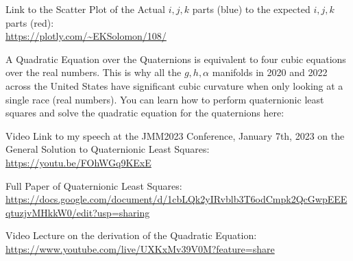 \documentclass[preprint,13pt]{elsarticle}
\begin{document}
Link to the Scatter Plot of the Actual $i,j,k$ parts (blue) to the expected $i,j,k$ parts (red):\\
\url{https://plotly.com/~EKSolomon/108/}

A Quadratic Equation over the Quaternions is equivalent to four cubic equations over the real numbers. This is why all the $g,h,\alpha$ manifolds in 2020 and 2022 across the United States have significant cubic curvature when only looking at a single race (real numbers). You can learn how to perform quaternionic least squares and solve the quadratic equation for the quaternions here:

Video Link to my speech at the JMM2023 Conference, January 7th, 2023 on the General Solution to Quaternionic Least Squares:\\
\url{https://youtu.be/FOhWGq9KExE}

Full Paper of Quaternionic Least Squares:\\
\url{https://docs.google.com/document/d/1cbLQk2yIRvblb3T6odCmpk2QcGwpEEEqtuzjvMHkkW0/edit?usp=sharing}

Video Lecture on the derivation of the Quadratic Equation:\\
\url{https://www.youtube.com/live/UXKxMv39V0M?feature=share}
\end{document}
